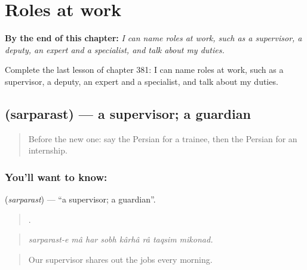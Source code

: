 
\chapter{Roles at work}
\label{ch:fa-roles-at-work}

\begin{chapteropening}
\textbf{By the end of this chapter:} \emph{I can name roles at work, such as a supervisor, a deputy, an expert and a specialist, and talk about my duties.}

Complete the last lesson of chapter 381: I can name roles at work, such as a supervisor, a deputy, an expert and a specialist, and talk about my duties.
\end{chapteropening}

\section[\texorpdfstring{\fa{سرپرست} (sarparast)}{سرپرست (sarparast)}]{ (sarparast) — a supervisor; a guardian}

\label{lesson:FA-C381-sarparast}



\begin{quote}
Before the new one: say the Persian for a trainee, then the Persian for an internship.
\end{quote}

\subsection*{You'll want to know: }
\textbf{} (\emph{sarparast}) — \textquotedblleft{}a supervisor; a guardian\textquotedblright{}.

\begin{quote}
       .
\end{quote}

\begin{quote}
\emph{sarparast-e mâ har sobh kârhâ râ taqsim mikonad.}
\end{quote}

\begin{quote}
Our supervisor shares out the jobs every morning.
\end{quote}

